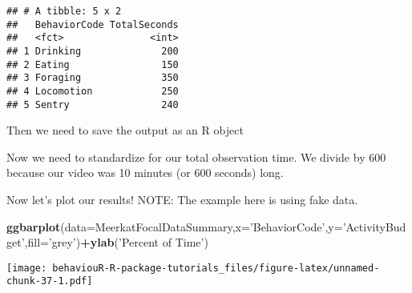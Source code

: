 \documentclass[]{book}
\newenvironment{Shaded}{\begin{snugshade}}{\end{snugshade}}
\newcommand{\DataTypeTok}[1]{\textcolor[rgb]{0.13,0.29,0.53}{#1}}
\newcommand{\DecValTok}[1]{\textcolor[rgb]{0.00,0.00,0.81}{#1}}
\newcommand{\KeywordTok}[1]{\textcolor[rgb]{0.13,0.29,0.53}{\textbf{#1}}}
\newcommand{\NormalTok}[1]{#1}
\newcommand{\OperatorTok}[1]{\textcolor[rgb]{0.81,0.36,0.00}{\textbf{#1}}}
\newcommand{\StringTok}[1]{\textcolor[rgb]{0.31,0.60,0.02}{#1}}
\begin{document}
\begin{verbatim}
## # A tibble: 5 x 2
##   BehaviorCode TotalSeconds
##   <fct>               <int>
## 1 Drinking              200
## 2 Eating                150
## 3 Foraging              350
## 4 Locomotion            250
## 5 Sentry                240
\end{verbatim}

Then we need to save the output as an R object

\begin{Shaded}
\end{Shaded}

Now we need to standardize for our total observation time. We divide by 600 because our video was 10 minutes (or 600 seconds) long.

\begin{Shaded}
\end{Shaded}

Now let's plot our results!
NOTE: The example here is using fake data.

\begin{Shaded}
\begin{Highlighting}[]
\KeywordTok{ggbarplot}\NormalTok{(}\DataTypeTok{data=}\NormalTok{MeerkatFocalDataSummary,}\DataTypeTok{x=}\StringTok{'BehaviorCode'}\NormalTok{,}\DataTypeTok{y=}\StringTok{'ActivityBudget'}\NormalTok{,}\DataTypeTok{fill=}\StringTok{'grey'}\NormalTok{)}\OperatorTok{+}\KeywordTok{ylab}\NormalTok{(}\StringTok{'Percent of Time'}\NormalTok{)}
\end{Highlighting}
\end{Shaded}

\texttt{[image: behaviouR-R-package-tutorials\_files/figure-latex/unnamed-chunk-37-1.pdf]}
\end{document}
